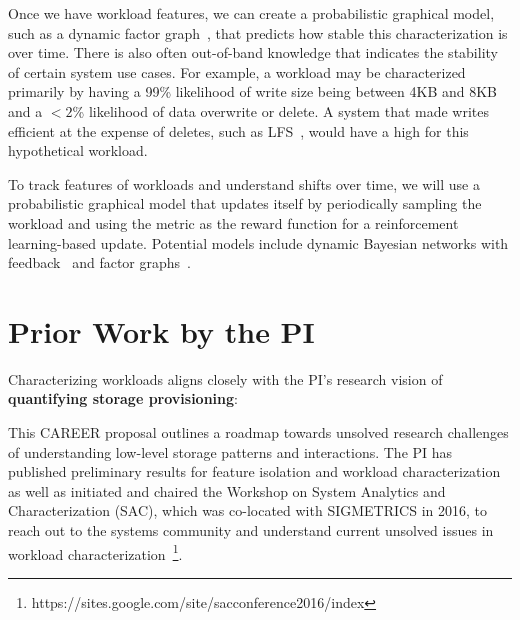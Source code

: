 Once we have workload features, we can create a probabilistic graphical model,
such as a dynamic factor graph~\cite{lecunfactor}, that predicts how stable this
characterization is over time.  There is also often out-of-band knowledge that
indicates the stability of certain system use cases.  For example, a
workload may be characterized primarily by having a 99\% likelihood of write
size being between 4KB and 8KB and a $< 2$\% likelihood of data overwrite or
delete.  A system that made writes efficient at the expense of deletes, such as
LFS~\cite{lfs}, would have a high \systemfit for this hypothetical workload.

To track features of workloads and understand shifts over time, we will use a
probabilistic graphical model that updates itself by periodically sampling the
workload and using the \systemfit metric as the reward function for a
reinforcement learning-based update.  Potential models include dynamic Bayesian
networks with feedback~\cite{poupart2006analytic} and factor
graphs~\cite{lecunfactor}.   

\section{Prior Work by the PI}
Characterizing workloads aligns closely with the PI's research vision of \textbf{quantifying storage provisioning}:

This CAREER proposal outlines a roadmap towards unsolved research challenges of understanding low-level storage patterns and interactions.  The PI has published preliminary results for feature isolation and workload characterization~\cite{wildani2015case,TK_MASCOTSSNAP,TK_HOTSTORSNAP} as well as initiated and chaired the Workshop on System Analytics and Characterization (SAC), which was co-located with SIGMETRICS in 2016, to reach out to the systems community and understand current unsolved issues in workload characterization~\footnote{https://sites.google.com/site/sacconference2016/index}.     

